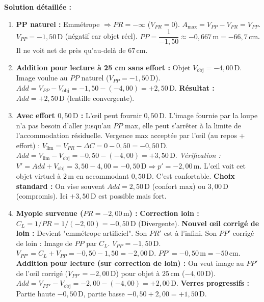 \documentclass[11pt]{article}
\begin{document}
\begin{exoresolu}
\tcblower
\textbf{Solution détaillée :}
\begin{enumerate}
    \item \textbf{PP naturel :} Emmétrope $\Rightarrow PR = -\infty$ ($V_{PR}=0$).
    $A_{\text{max}} = V_{PP} - V_{PR} = V_{PP}$.
    $V_{PP} = -1,50\,\text{D}$ (négatif car objet réel).
    $PP = \dfrac{1}{-1,50} \approx -0,667\,\text{m} = -66,7\,\text{cm}$.
    Il ne voit net de près qu'au-delà de $67\,\text{cm}$.
    \item \textbf{Addition pour lecture à 25 cm sans effort :} Objet $V_{\text{obj}} = -4,00\,\text{D}$. Image voulue au $PP$ naturel ($V_{PP} = -1,50\,\text{D}$).
    $Add = V_{PP} - V_{\text{obj}} = -1,50 - (-4,00) = +2,50\,\text{D}$.
    \textbf{Résultat :} $Add = +2,50\,\text{D}$ (lentille convergente).
    \item \textbf{Avec effort $0,50\,\text{D}$ :} L'œil peut fournir $0,50\,\text{D}$. L'image fournie par la loupe n'a pas besoin d'aller jusqu'au $PP$ max, elle peut s'arrêter à la limite de l'accommodation résiduelle.
    Vergence max acceptée par l'œil (au repos + effort) : $V_{\text{lim}} = V_{PR} - \Delta C = 0 - 0,50 = -0,50\,\text{D}$.
    $Add = V_{\text{lim}} - V_{\text{obj}} = -0,50 - (-4,00) = +3,50\,\text{D}$.
    \textit{Vérification :} $V' = Add + V_{\text{obj}} = 3,50 - 4,00 = -0,50\,\text{D} \Rightarrow p' = -2,00\,\text{m}$.
    L'œil voit cet objet virtuel à $2\,\text{m}$ en accommodant $0,50\,\text{D}$. C'est confortable.
    \textbf{Choix standard :} On vise souvent $Add = 2,50\,\text{D}$ (confort max) ou $3,00\,\text{D}$ (compromis). Ici $+3,50\,\text{D}$ est possible mais fort.
    \item \textbf{Myopie survenue ($PR = -2,00\,\text{m}$) :}
    \textbf{Correction loin :} $C_L = 1/PR = 1/(-2,00) = -0,50\,\text{D}$ (Divergente).
    \textbf{Nouvel œil corrigé de loin :} Devient "emmétrope artificiel". Son $PR'$ est à l'infini.
    Son $PP'$ corrigé de loin : Image de $PP$ par $C_L$.
    $V_{PP} = -1,50\,\text{D}$. $V_{PP'} = C_L + V_{PP} = -0,50 - 1,50 = -2,00\,\text{D}$.
    $PP' = -0,50\,\text{m} = -50\,\text{cm}$.
    \textbf{Addition pour lecture (sur correction de loin) :} On veut image au $PP'$ de l'œil corrigé ($V_{PP'} = -2,00\,\text{D}$) pour objet à $25\,\text{cm}$ ($-4,00\,\text{D}$).
    $Add = V_{PP'} - V_{\text{obj}} = -2,00 - (-4,00) = +2,00\,\text{D}$.
    \textbf{Verres progressifs :} Partie haute $-0,50\,\text{D}$, partie basse $-0,50 + 2,00 = +1,50\,\text{D}$.
\end{enumerate}
\end{exoresolu}
\end{document}
